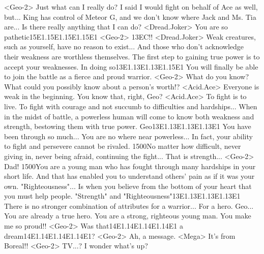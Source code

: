 <Geo-2> Just what can I really do? 
I said I would fight on behalf of Ace as well, but... 
King has control of Meteor G, and we don't know where Jack and Ms. Tia are... 
Is there really anything that I can do? 
<Dread.Joker> You are so pathetic{15}{E1}.{15}{E1}.{15}{E1}.{15}{E1} 
<Geo-2> {13}{EC}!! 
<Dread.Joker> Weak creatures, such as yourself, have no reason to exist... 
And those who don't acknowledge their weakness are worthless themselves. 
The first step to gaining true power is to accept your weaknesses. 
In doing so{13}{E1}.{13}{E1}.{13}{E1}.{15}{E1} 
You will finally be able to join the battle as a fierce and proud warrior. 
<Geo-2> What do you know? 
What could you possibly know about a person's worth!? 
<Acid.Ace> Everyone is weak in the beginning. 
You know that, right, Geo? 
<Acid.Ace> To fight is to live. 
To fight with courage and not succumb to difficulties and hardships... 
When in the midst of battle, a powerless human will come to know both weakness and 
strength, bestowing them with true power. 
Geo{13}{E1}.{13}{E1}.{13}{E1}.{13}{E1} You have been through so much... 
You are no where near powerless... 
In fact, your ability to fight and persevere cannot be rivaled. 
{15}{00}No matter how difficult, never giving in, never being afraid, continuing the fight... 
That is strength... 
<Geo-2> Dad! 
{15}{00}You are a young man who has fought through many hardships in your short life. 
And that has enabled you to understand others' pain as if it was your own. 
"Righteousness"... 
Is when you believe from the bottom of your heart that you must help people. 
"Strength" and "Righteousness"{13}{E1}.{13}{E1}.{13}{E1}.{13}{E1} 
There is no stronger combination of attributes for a warrior... For a hero. 
Geo... You are already a true hero. 
You are a strong, righteous young man. You make me so proud!! 
<Geo-2> Was that{14}{E1}.{14}{E1}.{14}{E1}.{14}{E1} a dream{14}{E1}.{14}{E1}.{14}{E1}.{14}{E1}? 
<Geo-2> Ah, a message. 
<Mega> It's from Boreal!! 
<Geo-2> TV...? I wonder what's up? 
